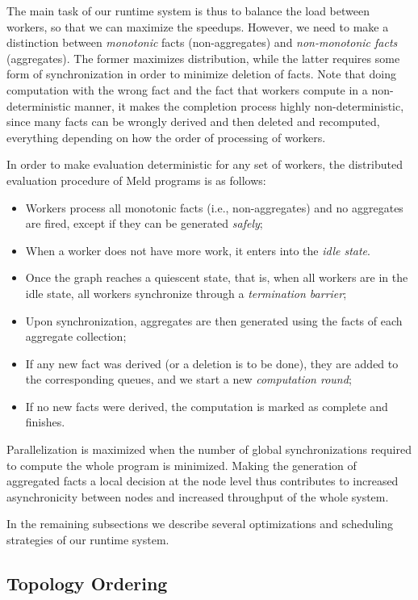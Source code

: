\documentclass[preprint]{sigplanconf}
\begin{document}
The main task of our runtime system is thus to balance the load between workers, so that we
can maximize the speedups. However, we need to make a distinction between \emph{monotonic}
facts (non-aggregates) and \emph{non-monotonic facts} (aggregates). The former maximizes
distribution, while the latter requires some form of synchronization in order to
minimize deletion of facts. Note that doing computation with the wrong fact and the fact
that workers compute in a non-deterministic manner, it makes the completion process highly
non-deterministic, since many facts can be wrongly derived and then deleted and recomputed,
everything depending on how the order of processing of workers.

In order to make evaluation deterministic for any set of workers,
the distributed evaluation procedure of Meld programs is as follows:

\begin{itemize}
   \item Workers process all monotonic facts (i.e., non-aggregates) and no aggregates are fired,
   except if they can be generated \emph{safely};
   \item When a worker does not have more work, it enters into the \emph{idle state}.
   \item Once the graph reaches a quiescent state, that is, when all workers are in
   the idle state, all workers synchronize through a \emph{termination barrier};
   \item Upon synchronization, aggregates are then generated using the facts of each
   aggregate collection;
   \item If any new fact was derived (or a deletion is to be done), they are added to the
   corresponding queues, and we start a new \emph{computation round};
   \item If no new facts were derived, the computation is marked as complete and finishes.
\end{itemize}

Parallelization is maximized when the number of global synchronizations required to compute
the whole program is minimized. Making the generation of aggregated facts a local decision
at the node level thus contributes to increased asynchronicity between nodes and increased
throughput of the whole system.

In the remaining subsections we describe several optimizations and scheduling strategies
of our runtime system.

\subsection{Topology Ordering}\label{sec:topology}
\end{document}
